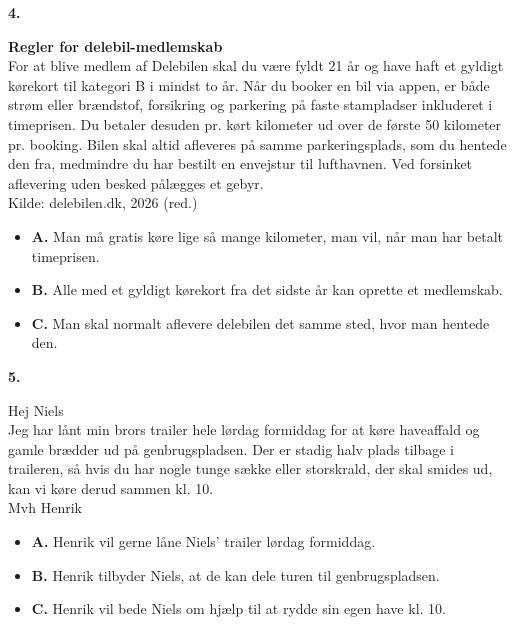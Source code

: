 \vspace{0.25em}
\textbf{\color{NCDRed}4.}
\begin{tcolorbox}[enhanced, breakable, colback=white, colframe=NCDGold, boxrule=0.8pt, arc=2pt, left=9pt, right=9pt, top=6pt, bottom=6pt]
\textbf{Regler for delebil-medlemskab}\\
For at blive medlem af Delebilen skal du være fyldt 21 år og have haft et gyldigt kørekort til kategori B i mindst to år. Når du booker en bil via appen, er både strøm eller brændstof, forsikring og parkering på faste stampladser inkluderet i timeprisen. Du betaler desuden pr. kørt kilometer ud over de første 50 kilometer pr. booking. Bilen skal altid afleveres på samme parkeringsplads, som du hentede den fra, medmindre du har bestilt en envejstur til lufthavnen. Ved forsinket aflevering uden besked pålægges et gebyr.\\[2pt]
\null\hfill {\small\color{NCDGray}Kilde: delebilen.dk, 2026 (red.)}
\end{tcolorbox}
\begin{itemize}[leftmargin=1.8em, itemsep=0.12em]
  \item[{\small\fbox{\phantom{\textsf{x}}}}] \textbf{A.} Man må gratis køre lige så mange kilometer, man vil, når man har betalt timeprisen.
  \item[{\small\fbox{\phantom{\textsf{x}}}}] \textbf{B.} Alle med et gyldigt kørekort fra det sidste år kan oprette et medlemskab.
  \item[{\small\fbox{\phantom{\textsf{x}}}}] \textbf{C.} Man skal normalt aflevere delebilen det samme sted, hvor man hentede den.
\end{itemize}

\clearpage
\textbf{\color{NCDRed}5.}
\begin{tcolorbox}[enhanced, breakable, colback=NCDBgGray, colframe=NCDTeal, boxrule=0.8pt, arc=8pt, left=10pt, right=10pt, top=6pt, bottom=6pt]
Hej Niels\\
Jeg har lånt min brors trailer hele lørdag formiddag for at køre haveaffald og gamle brædder ud på genbrugspladsen. Der er stadig halv plads tilbage i traileren, så hvis du har nogle tunge sække eller storskrald, der skal smides ud, kan vi køre derud sammen kl. 10.\\
Mvh Henrik
\end{tcolorbox}
\begin{itemize}[leftmargin=1.8em, itemsep=0.12em]
  \item[{\small\fbox{\phantom{\textsf{x}}}}] \textbf{A.} Henrik vil gerne låne Niels' trailer lørdag formiddag.
  \item[{\small\fbox{\phantom{\textsf{x}}}}] \textbf{B.} Henrik tilbyder Niels, at de kan dele turen til genbrugspladsen.
  \item[{\small\fbox{\phantom{\textsf{x}}}}] \textbf{C.} Henrik vil bede Niels om hjælp til at rydde sin egen have kl. 10.
\end{itemize}

